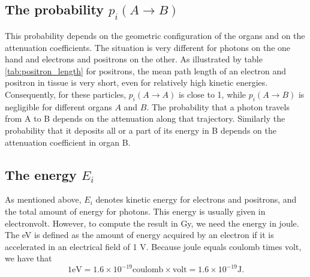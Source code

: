 \documentclass[11pt,oneside]{article}
\begin{document}
\subsection{The probability $p_i(A \rightarrow B)$}
This probability depends on the geometric configuration of the organs
and on the attenuation coefficients. The situation is very different
for photons on the one hand and electrons and positrons on the
other. As illustrated by table \ref{tab:positron_length} for
positrons, the mean path length of an electron and positron in tissue
is very short, even for relatively high kinetic
energies. Consequently, for these particles, $p_i(A \rightarrow A)$ is
close to 1, while $p_i(A \rightarrow B)$ is negligible for different
organs $A$ and $B$. The probability that a photon travels from A to B
depends on the attenuation along that trajectory. Similarly the
probability that it deposits all or a part of its energy in B depends
on the attenuation coefficient in organ B.


\subsection{The energy $E_i$}
As mentioned above, $E_i$ denotes kinetic energy for electrons and positrons,
and the total amount of energy for photons. This energy is usually given in
electronvolt. However, to compute the result in Gy, we need the energy in joule.
The eV is defined as the amount of energy acquired by an electron if it
is accelerated in an electrical field of 1 V. Because joule equals coulomb
times volt, we have that
\begin{equation}
 1 \mbox{eV} = 1.6 \times 10^{-19} \mbox{coulomb} \times \mbox{volt}
             = 1.6 \times 10^{-19} \mbox{J}.
\end{equation}
\end{document}
